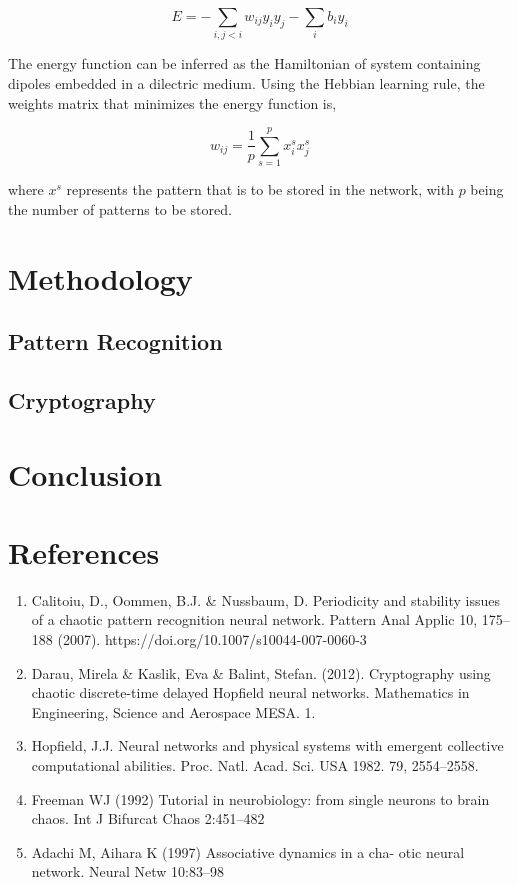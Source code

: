 \documentclass[12pt, letterpaper]{article}
\begin{document}
$$
E = -\sum_{i,j < i} w_{ij}y_i y_j - \sum_{i} b_i y_i
$$

The energy function can be inferred as the Hamiltonian of system containing dipoles embedded in a dilectric medium. Using the Hebbian learning rule, the weights matrix that minimizes the energy function is,

$$
w_{ij} = \frac{1}{p} \sum_{s=1}^p x_i^s x_j^s
$$

where $x^s$ represents the pattern that is to be stored in the network, with $p$ being the number of patterns to be stored.

\section*{Methodology}

\subsection*{Pattern Recognition}

\subsection*{Cryptography}

\section*{Conclusion}


\section*{References}

\fontsize{8}{12}\selectfont

\begin{enumerate}[leftmargin=*]
    \item Calitoiu, D., Oommen, B.J. \& Nussbaum, D. Periodicity and stability issues of a chaotic pattern recognition neural network. Pattern Anal Applic 10, 175–188 (2007). https://doi.org/10.1007/s10044-007-0060-3
    \item Darau, Mirela \& Kaslik, Eva \& Balint, Stefan. (2012). Cryptography using chaotic discrete-time delayed Hopfield neural networks. Mathematics in Engineering, Science and Aerospace MESA. 1.
    \item Hopfield, J.J. Neural networks and physical systems with emergent collective computational abilities.
    Proc. Natl. Acad. Sci. USA 1982. 79, 2554–2558.
    \item Freeman WJ (1992) Tutorial in neurobiology: from single neurons to brain chaos. Int J Bifurcat Chaos 2:451–482
    \item Adachi M, Aihara K (1997) Associative dynamics in a cha- otic neural network. Neural Netw 10:83–98
\end{enumerate}
\end{document}
